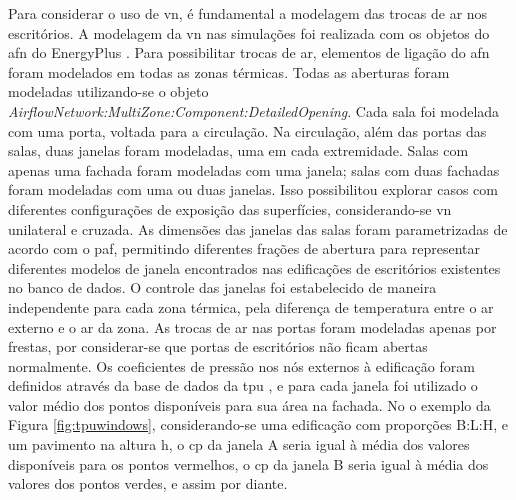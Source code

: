 \documentclass[brazil,hardcopy,openany]{ufscthesis} %
\begin{document}
Para considerar o uso de \acrfull{vn}, é fundamental a modelagem das trocas de ar nos escritórios. A modelagem da \acrshort{vn} nas simulações foi realizada com os objetos do \acrfull{afn} do EnergyPlus \cite{EnergyPlus2018}.
Para possibilitar trocas de ar, elementos de ligação do \acrshort{afn} foram modelados em todas as zonas térmicas.
Todas as aberturas foram modeladas utilizando-se o objeto \textit{AirflowNetwork:MultiZone:Component:DetailedOpening}.
Cada sala foi modelada com uma porta, voltada para a circulação.
Na circulação, além das portas das salas, duas janelas foram modeladas, uma em cada extremidade. 
Salas com apenas uma fachada foram modeladas com uma janela; salas com duas fachadas foram modeladas com uma ou duas janelas. Isso possibilitou explorar casos com diferentes configurações de exposição das superfícies, considerando-se \acrshort{vn} unilateral e cruzada.		
As dimensões das janelas das salas foram parametrizadas de acordo com o \acrfull{paf}, permitindo diferentes frações de abertura para representar diferentes modelos de janela encontrados nas edificações de escritórios existentes no banco de dados.
O controle das janelas foi estabelecido de maneira independente para cada zona térmica, pela diferença de temperatura entre o ar externo e o ar da zona.
As trocas de ar nas portas foram modeladas apenas por frestas, por considerar-se que portas de escritórios não ficam abertas normalmente.  %
Os coeficientes de pressão nos nós externos à edificação foram definidos através da base de dados da \acrlong{tpu} \cite{TPU2018}, e para cada janela foi utilizado o valor médio dos pontos disponíveis para sua área na fachada. No o exemplo da Figura \ref{fig:tpuwindows}, considerando-se uma edificação com proporções B:L:H, e um pavimento na altura h, o \acrshort{cp} da janela A seria igual à média dos valores disponíveis para os pontos vermelhos, o \acrshort{cp} da janela B seria igual à média dos valores dos pontos verdes, e assim por diante.
\end{document}
